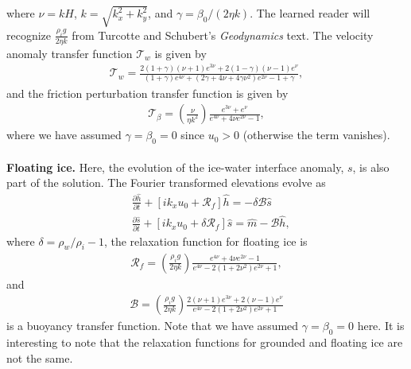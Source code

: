 \documentclass[paper=a4, fontsize=11pt]{article}
\begin{document}
where $\nu = kH$, $k=\sqrt{k_x^2+k_y^2}$, and $\gamma = \beta_0/(2\eta k)$.
The learned reader will recognize $\frac{\rho_i g }{2\eta k}$ from Turcotte and Schubert's \emph{Geodynamics} text.
The velocity anomaly transfer function $\mathcal{T}_w$ is given by
\begin{align}
\mathcal{T}_w = \frac{2(1+\gamma)(\nu+1)e^{3\nu}+2(1-\gamma)(\nu-1)e^{\nu}  }{(1+\gamma)e^{4\nu} + (2\gamma+4\nu+4\gamma\nu^2)e^{2\nu} -1 + \gamma },
\end{align}
and the friction perturbation transfer function is given by
\begin{align}
\mathcal{T}_{\beta} =  \left(\frac{\nu}{\eta k^2}\right) \frac{e^{3\nu} + e^{\nu}}{e^{4\nu} +4\nu e^{2\nu} -1 },
\end{align}
where we have assumed $\gamma=\beta_0=0$  since $u_0>0$ (otherwise the term vanishes).
\\ \\
\textbf{Floating ice.} Here, the evolution of the ice-water interface anomaly, $s$,
is also part of the solution.
The Fourier transformed elevations evolve as
\begin{align}
&\frac{\partial \widehat{h}}{\partial t}+ \left[ik_xu_0  + \mathcal{R}_f\right]\widehat{h} = -\delta\mathcal{B}\widehat{s}\label{hf}\\
&\frac{\partial \widehat{s}}{\partial t}+ [ik_xu_0 + \delta\mathcal{R}_f]\widehat{s} = \widehat{m} - \mathcal{B} \widehat{h}, \label{sf}
\end{align}
where $\delta = \rho_w/\rho_i -1$, the relaxation function for floating ice is
\begin{align}
\mathcal{R}_f = \left(\frac{\rho_i g}{2\eta k}\right) \frac{e^{4\nu} +4\nu e^{2\nu} -1 }{e^{4\nu} -2(1+2\nu^2)e^{2\nu} +1}, \label{Rf}
\end{align}
and
\begin{align}
\mathcal{B} = \left(\frac{\rho_i g}{2\eta k}\right) \frac{ 2(\nu+1)e^{3\nu}+2(\nu-1)e^{\nu} }{e^{4\nu} -2(1+2\nu^2)e^{2\nu} +1} \label{B}
\end{align}
is a buoyancy transfer function. Note that we have assumed $\gamma=\beta_0=0$ here.
It is interesting to note that the relaxation functions for grounded and floating
ice are not the same.
\end{document}
